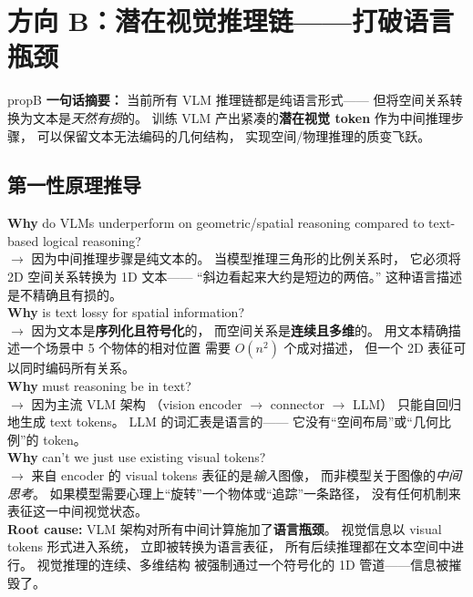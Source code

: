 \documentclass[12pt,a4paper]{article}
\begin{document}
\newpage
\section{方向 B：潜在视觉推理链——打破语言瓶颈}
\label{sec:propB}

\begin{proposalbox}{propB}
\textbf{一句话摘要：}
当前所有 VLM 推理链都是纯语言形式——
但将空间关系转换为文本是\textit{天然有损}的。
训练 VLM 产出紧凑的\textbf{潜在视觉 token}
作为中间推理步骤，
可以保留文本无法编码的几何结构，
实现空间/物理推理的质变飞跃。
\end{proposalbox}

\subsection{第一性原理推导}

\begin{whybox}
\textbf{Why} do VLMs underperform on geometric/spatial reasoning
compared to text-based logical reasoning?\\
$\rightarrow$ 因为中间推理步骤是纯文本的。
当模型推理三角形的比例关系时，
它必须将 2D 空间关系转换为 1D 文本——
``斜边看起来大约是短边的两倍。''
这种语言描述是不精确且有损的。\\[3pt]
\textbf{Why} is text lossy for spatial information?\\
$\rightarrow$ 因为文本是\textbf{序列化且符号化}的，
而空间关系是\textbf{连续且多维}的。
用文本精确描述一个场景中 5 个物体的相对位置
需要 $O(n^2)$ 个成对描述，
但一个 2D 表征可以同时编码所有关系。\\[3pt]
\textbf{Why} must reasoning be in text?\\
$\rightarrow$ 因为主流 VLM 架构
（vision encoder $\rightarrow$ connector $\rightarrow$ LLM）
只能自回归地生成 text tokens。
LLM 的词汇表是语言的——
它没有``空间布局''或``几何比例''的 token。\\[3pt]
\textbf{Why} can't we just use existing visual tokens?\\
$\rightarrow$ 来自 encoder 的 visual tokens 表征的是\textit{输入}图像，
而非模型关于图像的\textit{中间思考}。
如果模型需要心理上``旋转''一个物体或``追踪''一条路径，
没有任何机制来表征这一中间视觉状态。\\[3pt]
\textbf{Root cause:}
VLM 架构对所有中间计算施加了\textbf{语言瓶颈}。
视觉信息以 visual tokens 形式进入系统，
立即被转换为语言表征，
所有后续推理都在文本空间中进行。
视觉推理的连续、多维结构
被强制通过一个符号化的 1D 管道——信息被摧毁了。
\end{whybox}
\end{document}

